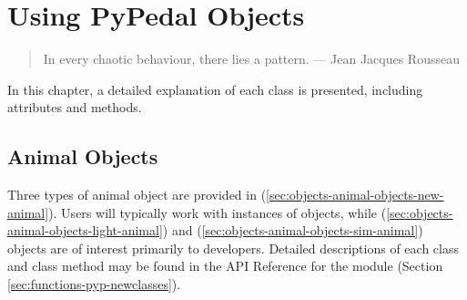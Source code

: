 \chapter{Using PyPedal Objects}
\begin{quote}
In every chaotic behaviour, there lies a pattern. --- Jean Jacques Rousseau
\end{quote}
\label{cha:using-pypedal-objects}
In this chapter, a detailed explanation of each \PyPedal{} class is presented, including attributes and methods.
\section{Animal Objects}
\label{sec:objects-animal-objects}
Three types of animal object are provided in \PyPedal{} (\ref{sec:objects-animal-objects-new-animal}). Users will typically work with instances of  objects, while  (\ref{sec:objects-animal-objects-light-animal}) and  (\ref{sec:objects-animal-objects-sim-animal}) objects are of interest primarily to developers. Detailed descriptions of each class and class method may be found in the API Reference for the  module (Section \ref{sec:functions-pyp-newclasses}).
